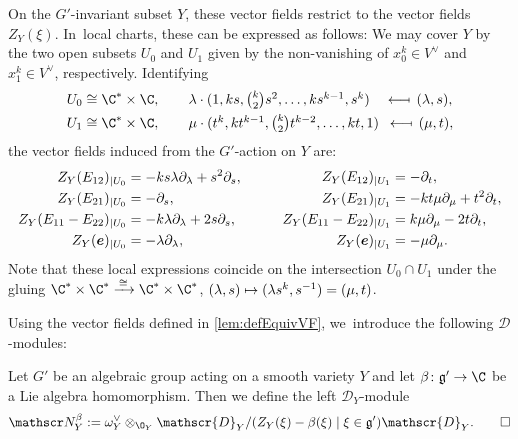 \documentclass[JEP,XML,SOM,Unicode,published]{cedram}
\newcommand\mto{\mathchoice{\longmapsto}{\mapsto}{\mapsto}{\mapsto}}
\newcommand\from{\mathchoice{\longleftarrow}{\leftarrow}{\leftarrow}{\leftarrow}}
\newcommand\mfrom{\mathrel{\from\joinrel\mapstochar}}
\newcommand{\bme}{{\boldsymbol{e}}}
\newcommand{\frg}{\mathfrak{g}}
\newcommand\restr[2]{{#1_{| {#2}}}}
\begin{document}
\begin{exa}
On the $G'$-invariant subset $Y$, these vector fields restrict to the vector fields $Z_Y(\xi)$. In~local charts, these can be expressed as follows: We may cover $Y$ by the two open subsets $U_0$ and $U_1$ given by the non-vanishing of $x_0^k \in V^\vee$ and $x_1^k \in V^\vee$, respectively. Identifying
\begin{align*}
U_0 &\cong \C^* \times \C, \qquad
\lambda \cdot {\textstyle(1,ks, \binom{k}{2}s^2,\dots,ks^{k-1},s^k)} \quad \mfrom \ (\lambda,s), \\
U_1 &\cong \C^* \times \C, \qquad
\mu \cdot {\textstyle(t^k,kt^{k-1},\binom{k}{2}t^{k-2},\dots,kt,1)} \ \, \mfrom \ (\mu,t),
\end{align*}
the vector fields induced from the $G'$-action on $Y$ are:
\[
\begin{array}{c@{\hspace{3em}}c}
\begin{aligned}
\restr{Z_Y(E_{12})}{U_0} &= -ks \lambda \partial_\lambda + s^2 \partial_s, \\
\restr{Z_Y(E_{21})}{U_0} &= -\partial_s, \\
\restr{Z_Y(E_{11}-E_{22})}{U_0} &= -k \lambda \partial_\lambda + 2 s \partial_s, \\
\restr{Z_Y(\bme)}{U_0} &= -\lambda \partial_\lambda,
\end{aligned} &
\begin{aligned}
\restr{Z_Y(E_{12})}{U_1} &= -\partial_t,\\
\restr{Z_Y(E_{21})}{U_1} &= -kt \mu \partial_\mu + t^2 \partial_t,\\
\restr{Z_Y(E_{11}-E_{22})}{U_1} &= k \mu \partial_\mu - 2 t \partial_t, \\
\restr{Z_Y(\bme)}{U_1} &= -\mu \partial_\mu.
\end{aligned}
\end{array}
\]
Note that these local expressions coincide on the intersection $U_0 \cap U_1$ under the gluing
$\C^* \times \C^* \xrightarrow{\,\cong\,} \C^* \times \C^*$, $(\lambda,s) \mto (\lambda s^k, s^{-1}) = (\mu,t)$.
\end{exa}

Using the vector fields defined in \cref{lem:defEquivVF}, we~introduce the following $\mathscr{D}$\nobreakdash-mod\-ules:

\begin{dfn} \label{def:NBeta}
Let $G'$ be an algebraic group acting on a smooth variety $Y$ and let $\beta \colon \frg' \to \C$ be a Lie algebra homomorphism. Then we define the left $\mathscr{D}_Y$\nobreakdash-mod\-ule
\[
\mathscr N_Y^\beta := \omega_Y^\vee \otimes_{\O_Y} \mathscr{D}_Y/(Z_Y(\xi)-\beta(\xi) \mid \xi \in \frg')\mathscr{D}_Y. \qedhere
\]
\end{dfn}
\end{document}
